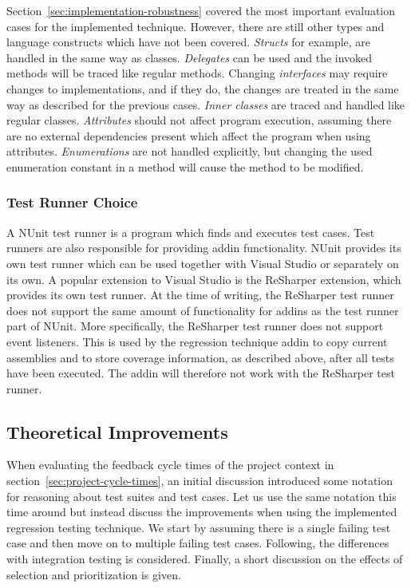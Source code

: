 \documentclass[a4paper,english,12pt]{report}
\begin{document}
Section~\ref{sec:implementation-robustness} covered the most important evaluation cases for the implemented technique. However, there are still other types and language constructs which have not been covered. \textit{Structs} for example, are handled in the same way as classes. \textit{Delegates} can be used and the invoked methods will be traced like regular methods. Changing \textit{interfaces} may require changes to implementations, and if they do, the changes are treated in the same way as described for the previous cases. \textit{Inner classes} are traced and handled like regular classes. \textit{Attributes} should not affect program execution, assuming there are no external dependencies present which affect the program when using attributes. \textit{Enumerations} are not handled explicitly, but changing the used enumeration constant in a method will cause the method to be modified.

\subsubsection{Test Runner Choice}
A NUnit test runner is a program which finds and executes test cases. Test runners are also responsible for providing addin functionality. NUnit provides its own test runner which can be used together with Visual Studio or separately on its own. A popular extension to Visual Studio is the ReSharper extension, which provides its own test runner. At the time of writing, the ReSharper test runner does not support the same amount of functionality for addins as the test runner part of NUnit. More specifically, the ReSharper test runner does not support event listeners. This is used by the regression technique addin to copy current assemblies and to store coverage information, as described above, after all tests have been executed. The addin will therefore not work with the ReSharper test runner.

\subsection{Theoretical Improvements}\label{sec:theoretical-improvements}
When evaluating the feedback cycle times of the project context in section~\vref{sec:project-cycle-times}, an initial discussion introduced some notation for reasoning about test suites and test cases. Let us use the same notation this time around but instead discuss the improvements when using the implemented regression testing technique. We start by assuming there is a single failing test case and then move on to multiple failing test cases. Following, the differences with integration testing is considered. Finally, a short discussion on the effects of selection and prioritization is given.
\end{document}
